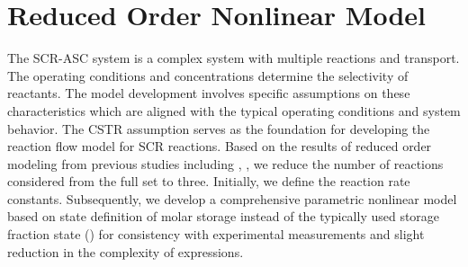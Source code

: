 \section{Reduced Order Nonlinear Model}

The SCR-ASC system is a complex system with multiple reactions and transport.
The operating conditions and concentrations determine the selectivity of
reactants. The model development involves specific assumptions on these
characteristics which are aligned with the typical operating conditions and
system behavior. The CSTR assumption serves as the foundation for developing
the reaction flow model for SCR reactions. Based on the results of reduced
order modeling from previous studies including
\cite{devarakonda2008adequacy}, \cite{jain2023diagnostics}, we reduce the number
of reactions considered from the full set to three. Initially, we define the
reaction rate constants. Subsequently, we develop a comprehensive parametric
nonlinear model based on state definition of molar storage instead of the
typically used storage fraction state (\cite{nova2014urea}) for consistency with
experimental measurements and slight reduction in the complexity of
expressions.




